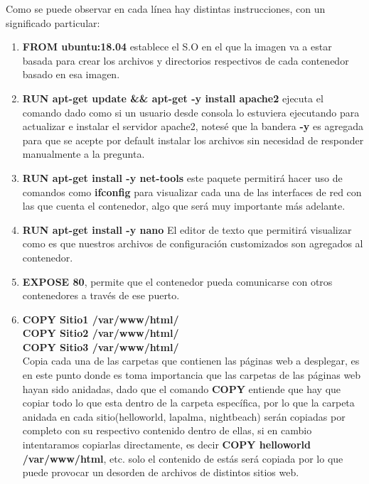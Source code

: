 \documentclass[10pt,letterpaper]{article}
\begin{document}
\begin{enumerate}
Como se puede observar en cada l\'inea hay distintas instrucciones, con un significado particular:\\
\begin{enumerate}
\item \textbf{FROM ubuntu:18.04} establece el S.O en el que la imagen va a estar basada para crear los archivos y directorios respectivos de cada contenedor basado en esa imagen.\\
\item \textbf{RUN apt-get update \&\& apt-get -y install apache2} ejecuta el comando dado como si un usuario desde consola lo estuviera ejecutando para actualizar e instalar el servidor apache2, notes\'e que la bandera \textbf{-y} es agregada para que se acepte por default instalar los archivos sin necesidad de responder manualmente a la pregunta.\\
\item \textbf{RUN apt-get install -y net-tools} este paquete permitir\'a hacer uso de comandos como \textbf{ifconfig} para visualizar cada una de las interfaces de red con las que cuenta el contenedor, algo que ser\'a muy importante m\'as adelante.\\
\item \textbf{RUN apt-get install -y nano} El editor de texto que permitir\'a visualizar como es que nuestros archivos de configuraci\'on customizados son agregados al contenedor.\\
\item \textbf{EXPOSE 80}, permite que el contenedor pueda comunicarse con otros contenedores a trav\'es de ese puerto.\\
\item \textbf{COPY Sitio1 /var/www/html/\\COPY Sitio2 /var/www/html/\\COPY Sitio3 /var/www/html/}\\
 
Copia cada una de las carpetas que contienen las p\'aginas web a desplegar, es en este punto donde es toma importancia que las carpetas de las p\'aginas web hayan sido anidadas, dado que el comando \textbf{COPY} entiende que hay que copiar todo lo que esta dentro de la carpeta espec\'ifica, por lo que la carpeta anidada en cada sitio(helloworld, lapalma, nightbeach) ser\'an copiadas por completo con su respectivo contenido dentro de ellas, si en cambio intentaramos copiarlas directamente, es decir \textbf{COPY helloworld /var/www/html}, etc. solo el contenido de est\'as ser\'a copiada por lo que puede provocar un desorden de archivos de distintos sitios web.\\


\end{enumerate}
\end{enumerate}
\end{document}
